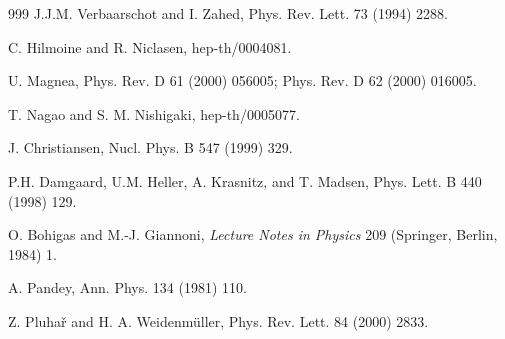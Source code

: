 \begin{thebibliography}{999}
         J.J.M. Verbaarschot and I. Zahed,
                      Phys. Rev. Lett. 73 (1994) 2288.       %

    C. Hilmoine and R. Niclasen,
                      hep-th/0004081.

      U. Magnea,
                      Phys. Rev. D 61 (2000) 056005;         %
                      Phys. Rev. D 62 (2000) 016005.

     T. Nagao and S. M. Nishigaki,
                      hep-th/0005077.

   J. Christiansen,
                      Nucl. Phys. B 547 (1999) 329.          %

                      P.H. Damgaard,  U.M. Heller, A. Krasnitz, and T. Madsen, 
                      Phys. Lett. B 440 (1998) 129.          %

     O. Bohigas and M.-J. Giannoni, 
                      {\em Lecture Notes in Physics\/} 209 
                      (Springer, Berlin, 1984) 1.            %

      A. Pandey, 
                      Ann. Phys. 134 (1981) 110.             %

 Z. Pluha\v r and H. A. Weidenm\"uller,
                      Phys. Rev. Lett. 84 (2000) 2833.


\end{thebibliography}
